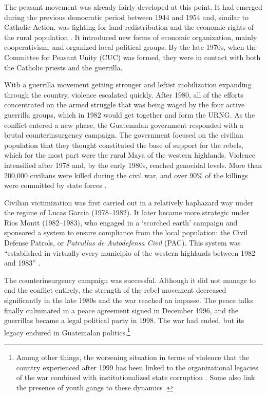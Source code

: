 \documentclass[12pt, notitlepage]{article}
\begin{document}
The peasant movement was already fairly developed at this point.
It had emerged during the previous democratic period between 1944 and 1954 and, similar to Catholic Action, was fighting for land redistribution and the economic rights of the rural population \citep{Handy:1994aa, Forster:2001aa}.
It introduced new forms of economic organization, mainly cooperativism, and organized local political groups.
By the late 1970s, when the Committee for Peasant Unity (CUC) was formed, they were in contact with both the Catholic priests and the guerrilla.

With a guerrilla movement getting stronger and leftist mobilization expanding through the country, violence escalated quickly.
After 1980, all of the efforts concentrated on the armed struggle that was being waged by the four active guerrilla groups, which in 1982 would get together and form the URNG.
As the conflict entered a new phase, the Guatemalan government responded with a brutal counterinsurgency campaign.
The government focused on the civilian population that they thought constituted the base of support for the rebels, which for the most part were the rural Maya of the western highlands.
Violence intensified after 1978 and, by the early 1980s, reached genocidal levels.
More than 200,000 civilians were killed during the civil war, and over 90\% of the killings were committed by state forces \citep{Ball:1999aa, CEH:1999aa}.

Civilian victimization was first carried out in a relatively haphazard way under the regime of Lucas Garcia (1978--1982).
It later became more strategic under Ríos Montt (1982--1983), who engaged in a `scorched earth' campaign and sponsored a system to ensure compliance from the local population: the Civil Defense Patrols, or \textit{Patrullas de Autodefensa Civil} (PAC).
This system was ``established in virtually every municipio of the western highlands between 1982 and 1983'' \citep[272]{Smith:1990ab}.

The counterinsurgency campaign was successful.
Although it did not manage to end the conflict entirely, the strength of the rebel movement decreased significantly in the late 1980s and the war reached an impasse.
The peace talks finally culminated in a peace agreement signed in December 1996, and the guerrillas became a legal political party in 1998.
The war had ended, but its legacy endured in Guatemalan politics.\footnote{Among other things, the worsening situation in terms of violence that the country experienced after 1999 has been linked to the organizational legacies of the war combined with institutionalized state corruption \citep{Peacock:2003tt, Beltran:2016td, Booth:2010wd}. Some also link the presence of youth gangs to these dynamics \citep{Levenson:2013tm}.}
\end{document}
